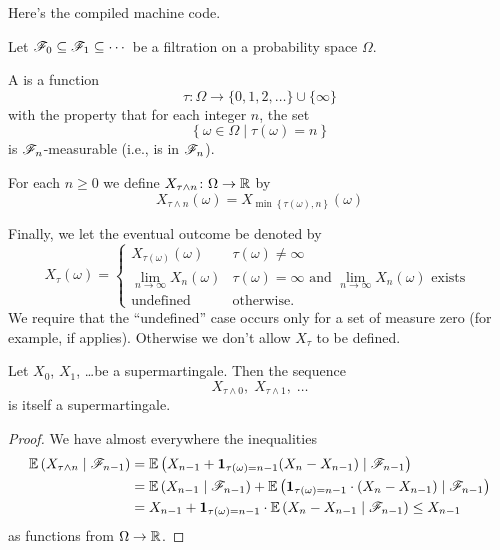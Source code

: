 Here's the compiled machine code.
\begin{definition}
	Let $\mathscr F_0 \subseteq \mathscr F_1 \subseteq \cdots$ be a filtration
	on a probability space $\Omega$.
	\begin{itemize}
		\ii A  is a function
		\[ \tau \colon \Omega \to \{0, 1, 2, \dots\} \cup \{\infty\} \]
		with the property that for each integer $n$, the set
		\[ \left\{ \omega \in \Omega \mid \tau(\omega) = n \right\} \]
		is $\mathscr F_n$-measurable (i.e., is in $\mathscr F_n$).

		\ii For each $n \ge 0$ we define
		$X_{\tau \wedge n} \colon \Omega \to \mathbb R$ by
		\[ X_{\tau \wedge n}(\omega)
		= X_{\min \left\{ \tau(\omega), n \right\}}(\omega) \]

		\ii Finally, we let the eventual outcome be denoted by
		\[ X_\tau(\omega)
			= \begin{cases}
				X_{\tau(\omega)}(\omega) & \tau(\omega) \neq \infty \\
				\lim_{n \to \infty} X_n(\omega) & \tau(\omega) = \infty
				\text{ and } \lim_{n \to \infty} X_n(\omega) \text{ exists } \\
				\text{undefined} & \text{otherwise}.
			\end{cases}
		\]
		We require that the ``undefined'' case occurs
		only for a set of measure zero
		(for example, if  applies).
		Otherwise we don't allow $X_\tau$ to be defined.
	\end{itemize}
\end{definition}


\begin{proposition}
	Let $X_0$, $X_1$, \dots be a supermartingale.
	Then the sequence
	\[ X_{\tau \wedge 0}, \; X_{\tau \wedge 1}, \; \dots \]
	is itself a supermartingale.
\end{proposition}
\begin{proof}
	We have almost everywhere the inequalities
	\begin{align*}
		\mathbb E\left( X_{\tau \wedge n} \mid \mathscr F_{n-1} \right)
		&= \mathbb E \left( X_{n-1} + \mathbf 1_{\tau(\omega) = n-1} (X_n - X_{n-1}) \mid \mathscr F_{n-1} \right) \\
		&= \mathbb E \left( X_{n-1} \mid \mathscr F_{n-1} \right)
		+ \mathbb E \left( \mathbf 1_{\tau(\omega) = n-1} \cdot (X_n - X_{n-1}) \mid \mathscr F_{n-1} \right) \\
		&= X_{n-1} + \mathbf 1_{\tau(\omega) = n-1}
			\cdot\mathbb E \left(  X_n - X_{n-1} \mid \mathscr F_{n-1} \right)
		\le X_{n-1}
	\end{align*}
	as functions from $\Omega \to \mathbb R$.
\end{proof}

